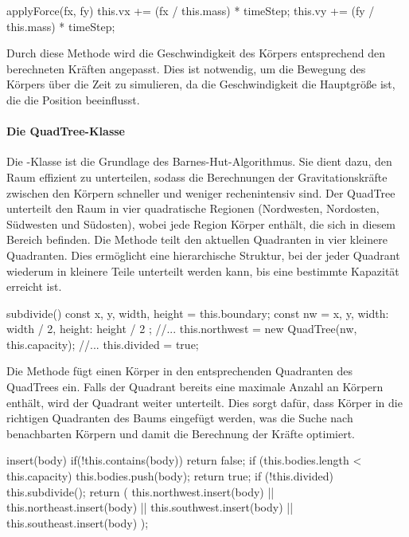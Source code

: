 \documentclass[a4paper,12pt,twoside]{article}
\begin{document}
\begin{javascript}
applyForce(fx, fy) {
    this.vx += (fx / this.mass) * timeStep;
    this.vy += (fy / this.mass) * timeStep;
}
\end{javascript}

Durch diese Methode wird die Geschwindigkeit des Körpers entsprechend den berechneten Kräften angepasst. Dies ist notwendig, um die Bewegung des Körpers über die Zeit zu simulieren, da die Geschwindigkeit die Hauptgröße ist, die die Position beeinflusst.

\paragraph{Die QuadTree-Klasse}
Die -Klasse ist die Grundlage des Barnes-Hut-Algorithmus. Sie dient dazu, den Raum effizient zu unterteilen, sodass die Berechnungen der Gravitationskräfte zwischen den Körpern schneller und weniger rechenintensiv sind. Der QuadTree unterteilt den Raum in vier quadratische Regionen (Nordwesten, Nordosten, Südwesten und Südosten), wobei jede Region Körper enthält, die sich in diesem Bereich befinden. Die Methode  teilt den aktuellen Quadranten in vier kleinere Quadranten. Dies ermöglicht eine hierarchische Struktur, bei der jeder Quadrant wiederum in kleinere Teile unterteilt werden kann, bis eine bestimmte Kapazität erreicht ist.

\begin{javascript}
subdivide() {
    const { x, y, width, height } = this.boundary;
    const nw = { x, y, width: width / 2, height: height / 2 };
	//...
    this.northwest = new QuadTree(nw, this.capacity);
	//...
    this.divided = true;
}
\end{javascript}

Die Methode  fügt einen Körper in den entsprechenden Quadranten des QuadTrees ein. Falls der Quadrant bereits eine maximale Anzahl an Körpern enthält, wird der Quadrant weiter unterteilt. Dies sorgt dafür, dass Körper in die richtigen Quadranten des Baums eingefügt werden, was die Suche nach benachbarten Körpern und damit die Berechnung der Kräfte optimiert.

\begin{javascript}
insert(body) {
    if(!this.contains(body)) return false;
    if (this.bodies.length < this.capacity) {
        this.bodies.push(body);
        return true;
    }
    if (!this.divided) this.subdivide();
    return (
        this.northwest.insert(body) ||
        this.northeast.insert(body) ||
        this.southwest.insert(body) ||
        this.southeast.insert(body)
    );
}
\end{javascript}
\end{document}
